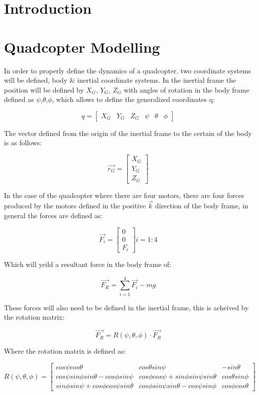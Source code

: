 \documentclass[12pt, letterpaper]{article}
\begin{document}
\section{Introduction}

\section{Quadcopter Modelling}
In order to properly define the dynamics of a quadcopter, two coordinate systems will be defined, body \& inertial coordinate systems. In the inertial frame the position will be defined by $X_{G}$, $Y_{G}$, $Z_{G}$ with angles of rotation in the body frame defined as $\psi$,$\theta$,$\phi$, which allows to define the generalized coordinates q:

\[
q=[\begin{array}{cccccc}
X_{G} & Y_{G} & Z_{G} & \psi & \theta & \phi\end{array}]
\]

The vector defined from the origin of the inertial
frame to the certain of the body is as follows:

\[
\overrightarrow{r_{G}}= \left[\begin{array}{c}
X_{G}\\
Y_{G}\\
Z_{G}
\end{array}\right]
\]

In the case of the quadcopter where there are four motors, there are
four forces produced by the motors defined in the positive $\overrightarrow{k}$ direction
of the body frame, in general the forces are defined as:

\[
\overrightarrow{F_{i}}=\left[\begin{array}{c}
0\\
0\\
F_{i}
\end{array}\right]i=1:4
\]

Which will yeild a resultant force in the body frame of:

\[
\overrightarrow{F_{R}}=\sum_{i=1}^{4}\overrightarrow{F_{i}}-mg
\]

These forces will also need to be defined in the inertial frame, this
is acheived by the rotation matrix:

\[
\overrightarrow{F_{R}}=R(\psi,\theta,\phi)\cdot \overrightarrow{F_{R}}
\]

Where the rotation matrix is defined as:

\[
R(\psi,\theta,\phi)=\left[\begin{array}{ccc}
cos\psi cos\theta & cos\theta sin\psi & -sin\theta\\
cos\psi sin\phi sin\theta-cos\phi sin\psi & cos\phi cos\psi+sin\phi sin\psi sin\theta & cos\theta sin\phi\\
sin\phi sin\psi+cos\phi cos\psi sin\theta & cos\phi sin\psi sin\theta-cos\psi sin\phi & cos\phi cos\theta
\end{array}\right]
\]
\end{document}
